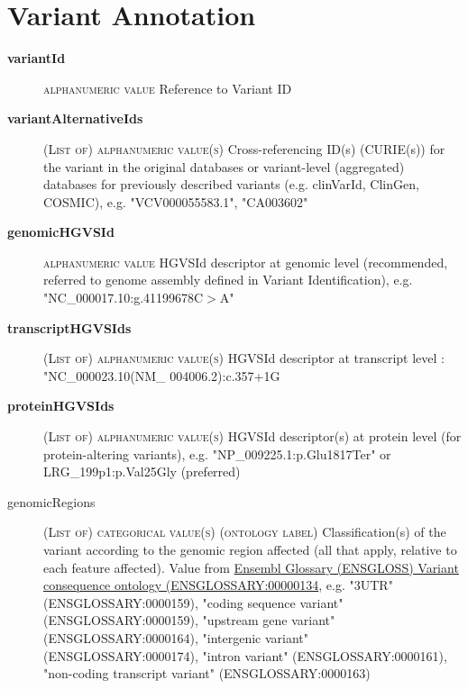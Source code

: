 \documentclass[a4paper, 10pt]{article}        %
\begin{document}
 
  \section*{ {\color{teal} Variant Annotation}}
  
  \begin{description}
	\item[\textbf{variantId}] {\textsc{alphanumeric value}} Reference to Variant ID 	\item[\textbf{variantAlternativeIds}] {\textsc{(List of) alphanumeric value(s)}} Cross-referencing ID(s) (CURIE(s)) for the variant in the original databases or variant-level (aggregated) databases for previously described variants (e.g. clinVarId, ClinGen, COSMIC), e.g. "VCV000055583.1", "CA003602"
	\item[\textbf{genomicHGVSId}]  {\textsc{alphanumeric value}} HGVSId descriptor at genomic level (recommended, referred to genome assembly defined in Variant Identification), e.g. "NC\_000017.10:g.41199678C$>$A"
	\item[\textbf{transcriptHGVSIds}] {\textsc{(List of) alphanumeric value(s)}} HGVSId descriptor at transcript level : "NC\_000023.10(NM\_ 004006.2):c.357+1G%
	\item[\textbf{proteinHGVSIds}] {\textsc{(List of) alphanumeric value(s)}} HGVSId descriptor(s) at protein level (for protein-altering variants), e.g. "NP\_009225.1:p.Glu1817Ter" or LRG\_199p1:p.Val25Gly (preferred)
	\item[genomicRegions] {\textsc{(List of) categorical value(s) (ontology label)}} Classification(s) of the variant according to the genomic region affected (all that apply, relative to each feature affected). Value from \href{http://ensembl.org/glossary/ENSGLOSSARY_0000134}{Ensembl Glossary (ENSGLOSS) Variant consequence ontology (ENSGLOSSARY:00000134}, e.g. "3UTR" (ENSGLOSSARY:0000159), "coding sequence variant" (ENSGLOSSARY:0000159), "upstream gene variant" (ENSGLOSSARY:0000164), "intergenic variant" (ENSGLOSSARY:0000174), "intron variant" (ENSGLOSSARY:0000161), "non-coding transcript variant" (ENSGLOSSARY:0000163)


\end{description}
\end{document}
